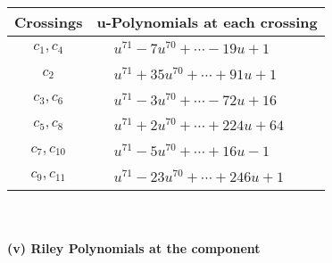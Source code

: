 \documentclass[1p]{elsarticle_modified}
\theoremstyle{definition}
\begin{document}
\begin{tabular}{m{50pt}|m{274pt}}
Crossings & \hspace{64pt}u-Polynomials at each crossing \\
\hline $$\begin{aligned}c_{1},c_{4}\end{aligned}$$&$\begin{aligned}
&u^{71}-7 u^{70}+\cdots-19 u+1
\end{aligned}$\\
\hline $$\begin{aligned}c_{2}\end{aligned}$$&$\begin{aligned}
&u^{71}+35 u^{70}+\cdots+91 u+1
\end{aligned}$\\
\hline $$\begin{aligned}c_{3},c_{6}\end{aligned}$$&$\begin{aligned}
&u^{71}-3 u^{70}+\cdots-72 u+16
\end{aligned}$\\
\hline $$\begin{aligned}c_{5},c_{8}\end{aligned}$$&$\begin{aligned}
&u^{71}+2 u^{70}+\cdots+224 u+64
\end{aligned}$\\
\hline $$\begin{aligned}c_{7},c_{10}\end{aligned}$$&$\begin{aligned}
&u^{71}-5 u^{70}+\cdots+16 u-1
\end{aligned}$\\
\hline $$\begin{aligned}c_{9},c_{11}\end{aligned}$$&$\begin{aligned}
&u^{71}-23 u^{70}+\cdots+246 u+1
\end{aligned}$\\
\hline
\end{tabular}\\~\\
\newpage\renewcommand{\arraystretch}{1}
\flushleft \textbf{(v) Riley Polynomials at the component}\newline \\
\end{document}
